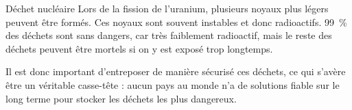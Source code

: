 \begin{doc}{Déchet nucléaire}
  Lors de la fission de l'uranium, plusieurs noyaux plus légers peuvent être formés.
  Ces noyaux sont souvent instables et donc radioactifs.
  \qty{99}{\percent} des déchets sont sans dangers, car très faiblement radioactif, mais le reste des déchets peuvent être mortels si on y est exposé trop longtemps.
  
  Il est donc important d'entreposer de manière sécurisé ces déchets, ce qui s'avère être un véritable casse-tête : aucun pays au monde n'a de solutions fiable sur le long terme pour stocker les déchets les plus dangereux.
\end{doc}